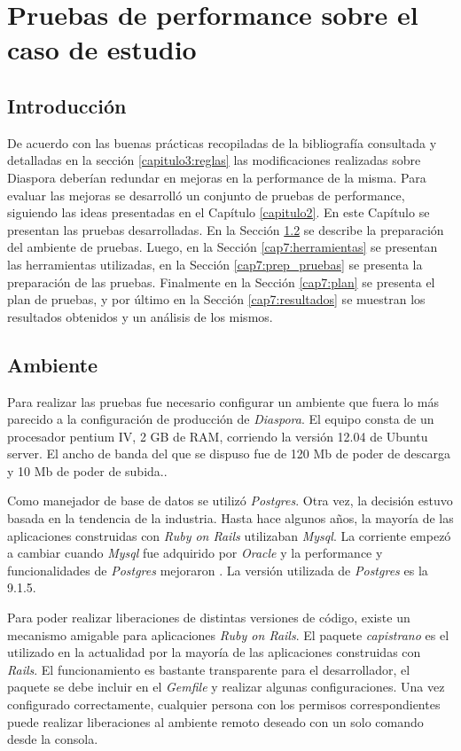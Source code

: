 \chapter{Pruebas de performance sobre el caso de estudio}
\label{capitulo7}
\section{Introducción}

De acuerdo con las buenas prácticas recopiladas de la bibliografía consultada y detalladas en la sección \ref{capitulo3:reglas} las modificaciones realizadas sobre Diaspora deberían 
redundar en mejoras en la performance de la misma. Para evaluar las mejoras se desarrolló un conjunto de pruebas de performance, siguiendo las ideas presentadas en el 
Capítulo \ref{capitulo2}. En este Capítulo se presentan las pruebas desarrolladas. En la Sección \ref{cap7:ambiente} se describe la preparación del ambiente de pruebas. Luego, en la 
Sección \ref{cap7:herramientas} se presentan las herramientas utilizadas, en la Sección \ref{cap7:prep_pruebas} se presenta la preparación de las pruebas. Finalmente en la Sección 
\ref{cap7:plan} se presenta el plan de pruebas, y por último en la Sección \ref{cap7:resultados} se muestran los resultados obtenidos y un análisis de los mismos.

\section{Ambiente}
\label{cap7:ambiente}

Para realizar las pruebas fue necesario configurar un ambiente que fuera lo más parecido a la configuración de producción de \emph{Diaspora}. El equipo consta de 
un procesador pentium IV, 2 GB de RAM, corriendo la versión 12.04 de Ubuntu server. El ancho de banda del que se dispuso fue de 120 Mb de poder de 
descarga y 10 Mb de poder de subida..

Como manejador de base de datos se utilizó \emph{Postgres}. Otra vez, la decisión estuvo basada en la tendencia de la industria. Hasta hace algunos años, la mayoría de las
aplicaciones construidas con \emph{Ruby on Rails} utilizaban \emph{Mysql}. La corriente empezó a cambiar cuando \emph{Mysql} fue
adquirido por \emph{Oracle} y la performance y funcionalidades de \emph{Postgres} mejoraron \cite{nginx_vs_apache}. La versión utilizada de \emph{Postgres} es la 9.1.5.

Para poder realizar liberaciones de distintas versiones de código, existe un mecanismo amigable para aplicaciones \emph{Ruby on Rails}. El paquete \emph{capistrano} \cite{capistrano} es el  utilizado 
en la actualidad por la mayoría de las aplicaciones construidas con \emph{Rails}. El funcionamiento es bastante transparente para el desarrollador, el paquete se debe incluir en el 
\emph{Gemfile} y realizar algunas configuraciones. Una vez configurado correctamente, cualquier persona con los permisos correspondientes puede realizar
liberaciones al ambiente remoto deseado con un solo comando desde la consola.

